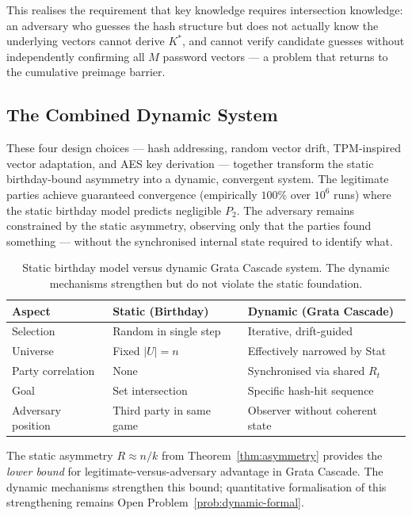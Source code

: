 \documentclass[11pt,a4paper]{article}
\begin{document}
This realises the requirement that key knowledge requires intersection knowledge: an adversary who guesses the hash structure but does not actually know the underlying vectors cannot derive $K^*$, and cannot verify candidate guesses without independently confirming all $M$ password vectors --- a problem that returns to the cumulative preimage barrier.

\subsection{The Combined Dynamic System}

These four design choices --- hash addressing, random vector drift, TPM-inspired vector adaptation, and AES key derivation --- together transform the static birthday-bound asymmetry into a dynamic, convergent system. The legitimate parties achieve guaranteed convergence (empirically $100\%$ over $10^6$ runs) where the static birthday model predicts negligible $P_2$. The adversary remains constrained by the static asymmetry, observing only that the parties found something --- without the synchronised internal state required to identify what.

\begin{table}[ht]
\centering
\small
\begin{tabular}{lll}
\toprule
Aspect & Static (Birthday) & Dynamic (Grata Cascade) \\
\midrule
Selection & Random in single step & Iterative, drift-guided \\
Universe & Fixed $|U| = n$ & Effectively narrowed by Stat \\
Party correlation & None & Synchronised via shared $R_t$ \\
Goal & Set intersection & Specific hash-hit sequence \\
Adversary position & Third party in same game & Observer without coherent state \\
\bottomrule
\end{tabular}
\caption{Static birthday model versus dynamic Grata Cascade system. The dynamic mechanisms strengthen but do not violate the static foundation.}
\label{tab:static-vs-dynamic}
\end{table}

The static asymmetry $R \approx n/k$ from Theorem~\ref{thm:asymmetry} provides the \emph{lower bound} for legitimate-versus-adversary advantage in Grata Cascade. The dynamic mechanisms strengthen this bound; quantitative formalisation of this strengthening remains Open Problem~\ref{prob:dynamic-formal}.
\end{document}
